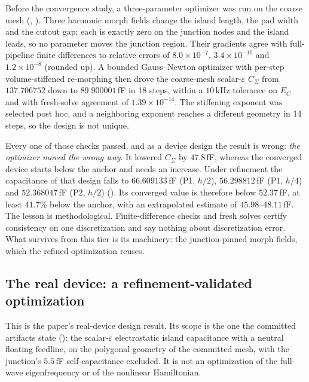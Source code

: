 \documentclass{anvil-paper}
\begin{document}
Before the convergence study, a three-parameter optimizer was run on
the coarse mesh
(,
). Three
harmonic morph fields change the island length, the pad width and the
cutout gap; each is exactly zero on the junction nodes and the island
leads, so no parameter moves the junction region. Their gradients agree
with full-pipeline finite differences to relative errors of
$8.0\times10^{-7}$, $3.4\times10^{-10}$ and $1.2\times10^{-8}$ (rounded up). A
bounded Gauss--Newton optimizer with per-step volume-stiffened
re-morphing then drove the coarse-mesh scalar-$\varepsilon$ $C_\Sigma$
from $137.706752$ down to $89.900001$\,fF in 18 steps, within a
$10$\,kHz tolerance on $E_C$ and with fresh-solve agreement of
$1.39\times10^{-14}$. The stiffening exponent was selected post hoc,
and a neighboring exponent reaches a different geometry in 14 steps, so
the design is not unique.

Every one of those checks passed, and as a device design the result is
wrong: \emph{the optimizer moved the wrong way}. It lowered $C_\Sigma$
by $47.8$\,fF, whereas the converged device starts below the anchor and
needs an increase. Under refinement the capacitance of that design
falls to $66.609133$\,fF (P1, $h/2$), $56.298812$\,fF (P1, $h/4$) and
$52.368047$\,fF (P2, $h/2$)
(). Its
converged value is therefore below $52.37$\,fF, at least $41.7\%$ below
the anchor, with an extrapolated estimate of $45.98$--$48.11$\,fF. The
lesson is methodological. Finite-difference checks and fresh solves
certify consistency on one discretization and say nothing about
discretization error. What survives from this tier is its machinery:
the junction-pinned morph fields, which the refined optimization
reuses.

\subsection{The real device: a refinement-validated optimization}
\label{sec:refined}

This is the paper's real-device design result. Its scope is the one the
committed artifacts state
(): the
scalar-$\varepsilon$ electrostatic island capacitance with a neutral
floating feedline, on the polygonal geometry of the committed mesh,
with the junction's $5.5$\,fF self-capacitance excluded. It is not an
optimization of the full-wave eigenfrequency or of the nonlinear
Hamiltonian.
\end{document}
